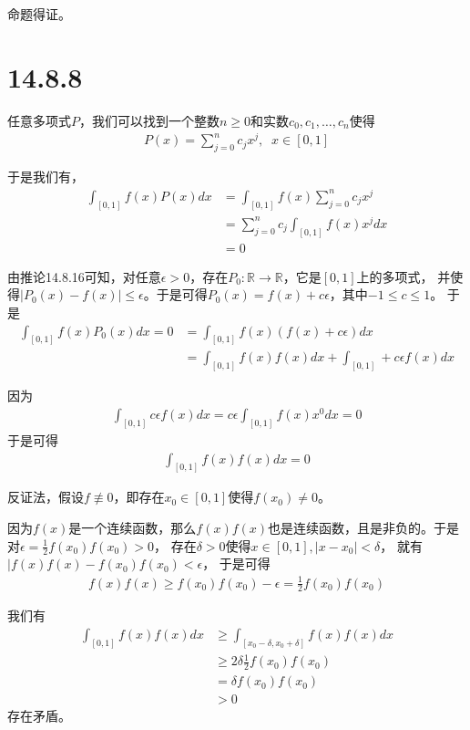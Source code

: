 \documentclass{article}
\begin{document}
命题得证。

\section*{14.8.8}

任意多项式$P$，我们可以找到一个整数$n \geq 0$和实数$c_0, c_1, \dots, c_n$使得
\begin{align*}
  P(x) = \sum\limits_{j = 0}^n c_j x^j, \;\; x \in [0, 1]
\end{align*}

于是我们有，
\begin{align*}
  \int_{[0, 1]} f(x) P(x) dx
   & = \int_{[0, 1]} f(x) \sum\limits_{j = 0}^n c_j x^j    \\
   & = \sum\limits_{j = 0}^n c_j \int_{[0, 1]} f(x) x^j dx \\
   & = 0
\end{align*}

由推论14.8.16可知，对任意$\epsilon > 0$，存在$P_0: \mathbb{R} \to \mathbb{R}$，它是$[0, 1]$上的多项式，
并使得$|P_0(x) - f(x)| \leq \epsilon$。于是可得$P_0(x) = f(x) + c\epsilon$，其中$-1 \leq c \leq 1$。
于是
\begin{align*}
  \int_{[0, 1]} f(x) P_0(x) dx = 0
   & = \int_{[0, 1]} f(x) (f(x) + c\epsilon)dx                        \\
   & = \int_{[0, 1]} f(x) f(x) dx + \int_{[0, 1]} + c\epsilon f(x) dx
\end{align*}

因为
\begin{align*}
  \int_{[0, 1]} c \epsilon f(x) dx = c \epsilon \int_{[0, 1]} f(x) x^0 dx = 0
\end{align*}
于是可得
\begin{align*}
  \int_{[0, 1]} f(x) f(x) dx = 0
\end{align*}

反证法，假设$f \not \equiv 0$，即存在$x_0 \in [0, 1]$使得$f(x_0) \neq 0$。

因为$f(x)$是一个连续函数，那么$f(x)f(x)$也是连续函数，且是非负的。于是对$\epsilon = \frac{1}{2}f(x_0)f(x_0) > 0$，
存在$\delta > 0$使得$x \in [0, 1], |x - x_0| < \delta$，
就有$|f(x)f(x) - f(x_0)f(x_0) < \epsilon$，
于是可得
\begin{align*}
  f(x)f(x) \geq f(x_0)f(x_0) - \epsilon = \frac{1}{2}f(x_0)f(x_0)
\end{align*}

我们有
\begin{align*}
  \int_{[0, 1]} f(x) f(x) dx
   & \geq \int_{[x_0 - \delta, x_0 + \delta]} f(x)f(x) dx \\
   & \geq 2\delta \frac{1}{2} f(x_0)f(x_0)                \\
   & = \delta f(x_0)f(x_0)                                \\
   & > 0
\end{align*}
存在矛盾。
\end{document}
